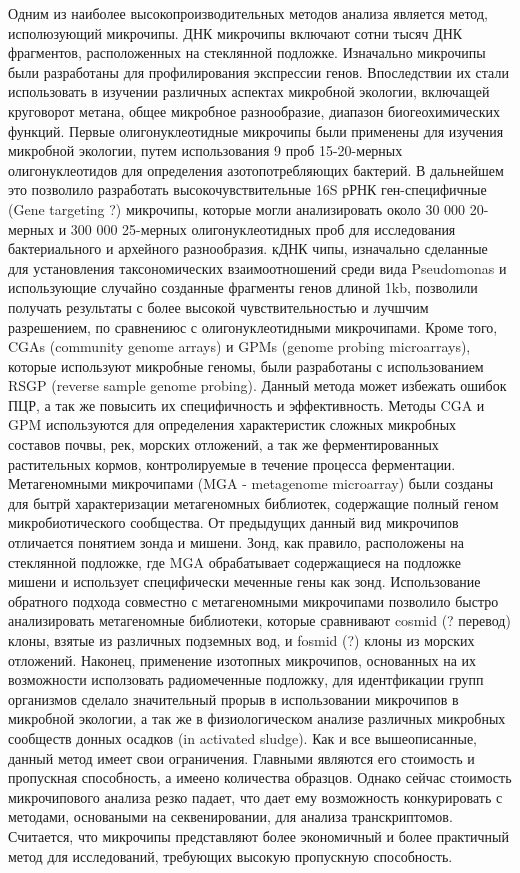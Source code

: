 Одним из наиболее высокопроизводительных методов анализа является метод, исполюзующий микрочипы. ДНК микрочипы включают сотни тысяч ДНК фрагментов, расположенных на стеклянной подложке. Изначально микрочипы были разработаны для профилирования экспрессии генов. Впоследствии их стали использовать в изучении различных
аспектах микробной экологии, включащей круговорот метана, общее микробное разнообразие, диапазон биогеохимических функций. Первые олигонуклеотидные микрочипы были
применены для изучения микробной экологии, путем использования 9 проб 15-20-мерных
олигонуклеотидов для определения азотопотребляющих бактерий. В дальнейшем это позволило разработать высокочувствительные 16S рРНК ген-специфичные (Gene targeting ?)
микрочипы, которые могли анализировать около 30 000 20-мерных и 300 000 25-мерных олигонуклеотидных проб для исследования бактериального и архейного разнообразия. кДНК
чипы, изначально сделанные для установления таксономических взаимоотношений среди
вида Pseudomonas и использующие случайно созданные фрагменты генов длиной 1kb, позволили получать результаты с более высокой чувствительностью и лучшчим разрешением,
по сравнениюс с олигонуклеотидными микрочипами. Кроме того, CGAs (community genome
arrays) и GPMs (genome probing microarrays), которые используют микробные геномы, были
разработаны с использованием RSGP (reverse sample genome probing). Данный метода может
избежать ошибок ПЦР, а так же повысить их специфичность и эффективность. Методы CGA
и GPM используются для определения характеристик сложных микробных составов почвы,
рек, морских отложений, а так же ферментированных растительных кормов, контролируемые в течение процесса ферментации. Метагеномными микрочипами (MGA - metagenome
microarray) были созданы для бытрй характеризации метагеномных библиотек, содержащие полный геном микробиотического сообщества. От предыдущих данный вид микрочипов
отличается понятием зонда и мишени. Зонд, как правило, расположены на стеклянной подложке, где MGA обрабатывает содержащиеся на подложке мишени и использует специфически меченные гены как зонд. Использование обратного подхода совместно с метагеномными
микрочипами позволило быстро анализировать метагеномные библиотеки, которые сравнивают cosmid (? перевод) клоны, взятые из различных подземных вод, и fosmid (?) клоны
из морских отложений. Наконец, применение изотопных микрочипов, основанных на их возможности исползовать радиомеченные подложку, для идентфикации групп организмов сделало значительный прорыв в использовании микрочипов в микробной экологии, а так же
в физиологическом анализе различных микробных сообществ донных осадков (in activated
sludge). Как и все вышеописанные, данный метод имеет свои ограничения. Главными являются его стоимость и пропускная способность, а имеено количества образцов. Однако сейчас
стоимость микрочипового анализа резко падает, что дает ему возможность конкурировать
с методами, основаными на секвенировании, для анализа транскриптомов. Считается, что
микрочипы представляют более экономичный и более практичный метод для исследований,
требующих высокую пропускную способность.

